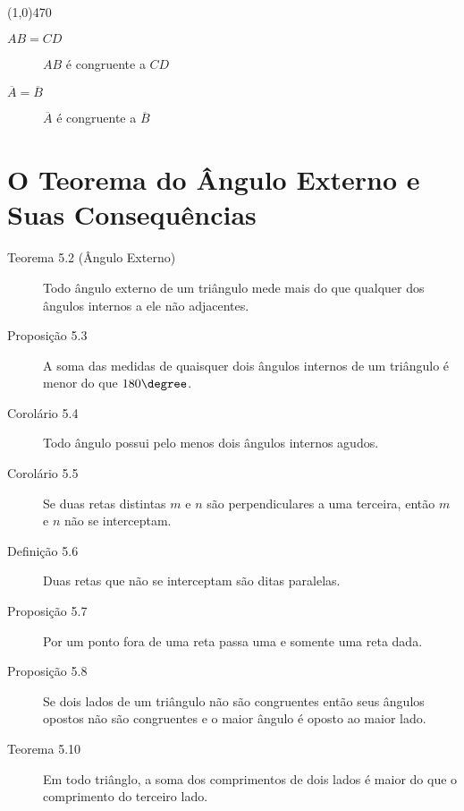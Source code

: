 \line(1,0){470}

\begin{description}
  \item[$AB = CD$] $AB$ é congruente a $CD$
  \item[$\overline{A} = \overline{B}$] $\overline{A}$ é congruente a
    $\overline{B}$
\end{description}

\section{O Teorema do Ângulo Externo e Suas Consequências}

\begin{description}
  \item[Teorema 5.2 (Ângulo Externo)] Todo ângulo externo de um triângulo mede mais do que qualquer dos ângulos internos a ele não adjacentes.

  \item[Proposição 5.3] A soma das medidas de quaisquer dois ângulos internos de um triângulo é menor do que $180\degree$.

  \item[Corolário 5.4] Todo ângulo possui pelo menos dois ângulos internos agudos.

  \item[Corolário 5.5] Se duas retas distintas $m$ e $n$ são perpendiculares a uma terceira, então $m$ e $n$ não se interceptam.

  \item[Definição 5.6] Duas retas que não se interceptam são ditas paralelas.

  \item[Proposição 5.7] Por um ponto fora de uma reta passa uma e somente uma reta dada.

  \item[Proposição 5.8] Se dois lados de um triângulo não são congruentes então seus ângulos opostos não são congruentes e o maior ângulo é oposto ao maior lado.

  \item[Teorema 5.10] Em todo triânglo, a soma dos comprimentos de dois lados é maior do que o comprimento do terceiro lado.

\end{description}

